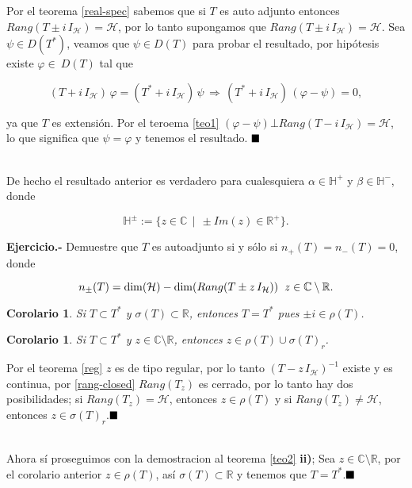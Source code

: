 \documentclass[letterpaper]{report}
\newtheorem{cor}[teorema]{Corolario}
\newcommand{\nat}{\ensuremath{ \mathbb N }}
\newcommand{\co}{\ensuremath{\mathbb C }}
\newcommand{\hil}{\ensuremath{\mathcal H }}
\newcommand{\re}{\ensuremath{\mathbb R }}
\newcommand{\hip}{\ensuremath{\mathbb H}}
\newcommand{\qed}{\ensuremath{\hspace*{0em plus 1fill}\blacksquare}}
\begin{document}
\begin{dem}
Por el teorema \ref{real-spec} sabemos que si $T$ es auto adjunto entonces $Rang(T\pm i\,I_{\hil})=\hil$, por lo tanto supongamos que \hbox{$Rang(T\pm i\,I_{\hil})=\hil$}. Sea $\psi\in D(T^*)$, veamos que $\psi\in D(T)$ para probar el resultado, por hipótesis existe $\varphi\in\ D(T)$ tal que 

$$
(T+i\,I_{\hil})\,\varphi=(T^*+i\,I_{\hil})\,\psi\,\Rightarrow\,(T^*+i\,I_{\hil})\,(\varphi-\psi)=0,
$$

ya que $T$ es extensión. Por el teroema \ref{teo1} \hbox{$(\varphi-\psi)\bot Rang(T-i\,I_{\hil})=\hil$}, lo que significa que $\psi=\varphi$ y tenemos el resultado. \qed
\end{dem}\\

\noindent De hecho el resultado anterior es verdadero para cualesquiera $\alpha\in\hip^+$ y $\beta\in\hip^{-}$, donde 

$$\hip^{\pm}:=\lbrace z\in\co\,\mid\,\pm Im(z)\in\re^+\rbrace.$$

\noindent\textbf{Ejercicio.-} Demuestre que $T$ es autoadjunto si y sólo si $n_{+}(T)=n_{-}(T)=0$, donde

\begin{equation}
n_{\pm}(T)=\dim(\hil)-\dim(Rang(T\pm z\,I_{\hil}))
\hspace{0.2cm}z\in\co\setminus\re.
\end{equation}

\begin{cor}
Si $T\subset T^*$ y $\sigma(T)\subset\re$, entonces $T=T^*$ pues $\pm i\in\rho(T)$. 
\end{cor}

\begin{cor}
Si $T\subset T^*$ y $z\in\co\setminus\re$, entonces $z\in\rho(T)\cup\sigma(T)_r$. 
\end{cor}

\begin{dem}
Por el teorema \ref{reg} $z$ es de tipo regular, por lo tanto $(T-z\,I_{\hil})^{-1}$ existe y es continua, por \ref{rang-closed} $Rang(T_z)$ es cerrado, por lo tanto hay dos posibilidades; si $Rang(T_z)=\hil$, entonces $z\in\rho(T)$ y si $Rang(T_z)\neq\hil$, entonces $z\in\sigma(T)_r$.\qed 
\end{dem}\\

\noindent Ahora sí proseguimos con la demostracion al teorema \ref{teo2} \textbf{ii)}; Sea $z\in\co\setminus\re$, por el corolario anterior $z\in\rho(T)$, así $\sigma(T)\subset\re$ y tenemos que $T=T^*$.\qed
\end{document}
